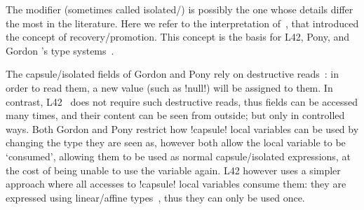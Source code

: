 
The \Q@capsule@ modifier (sometimes called isolated/\Q@iso@) is possibly the one whose details differ the most in the literature. Here we refer to the interpretation of~\cite{GordonEtAl12}, that introduced the concept of recovery/promotion.
This concept is the basis for L42, Pony, and Gordon \etal's type systems~\cite{GordonEtAl12,ServettoEtAl13a,ServettoZucca15,ServettoEtAl13a,clebsch2015deny,clebsch2017orca}. 



The capsule/isolated fields of Gordon \etal and Pony rely on destructive reads~\cite{GordonEtAl12,clebsch2015deny}: in order to read them, a new value (such as \Q!null!) will be assigned to them. In contrast, L42~\cite{ServettoEtAl13a,ServettoZucca15} does not require such destructive reads, thus \Q@capsule@ fields can be accessed many times, and their content can be seen from outside; but only in controlled ways.
Both Gordon \etal and Pony restrict how \Q!capsule! local variables can be used by changing the type they are seen as, however both allow the local variable to be `consumed', allowing them to be used as normal capsule/isolated expressions, at the cost of being unable to use the variable again. L42 however uses a simpler approach where all accesses to \Q!capsule! local variables consume them: they are expressed using linear/affine types~\cite{boyland2001alias}, thus they can only be used once.

